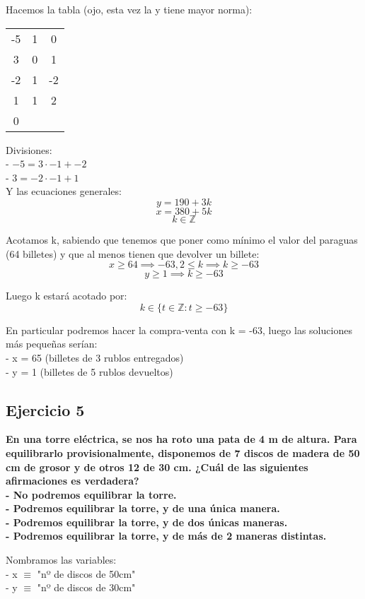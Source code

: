 \documentclass[11pt, a4paper, titlepage]{article}
\providecommand{\ent}{\mathbb{Z}}
\begin{document}
Hacemos la tabla (ojo, esta vez la y tiene mayor norma):

\begin{center}
\begin{tabular}{c|cc}
-5 & 1 & 0 \\
3 & 0 & 1 \\
\hline
-2 & 1 & -2 \\
\hline
1 & 1 & 2 \\
\hline
0
\end{tabular}
\end{center}

Divisiones: \\
- $ -5 = 3 \cdot -1 + -2 $ \\
- $ 3 = -2 \cdot -1 + 1 $ \\

Y las ecuaciones generales:
$$ y = 190 + 3k $$
$$ x = 380 + 5k $$
$$ k \in \ent $$

Acotamos k, sabiendo que tenemos que poner como mínimo el valor del paraguas (64 billetes) y que al menos tienen que devolver un billete:
$$ x \geq 64 \implies -63,2 \leq k \implies k \geq -63 $$
$$ y \geq 1 \implies k \geq -63 $$

Luego k estará acotado por:
$$ k \in \{ t \in \ent : t \geq -63 \} $$

En particular podremos hacer la compra-venta con k = -63, luego las soluciones más pequeñas serían: \\
- x = 65 (billetes de 3 rublos entregados) \\
- y = 1 (billetes de 5 rublos devueltos) \\

\subsection{\LARGE{Ejercicio 5}}

\textbf{En una torre eléctrica, se nos ha roto una pata de 4 m de altura. Para
equilibrarlo provisionalmente, disponemos de 7 discos de madera de 50 cm de grosor
y de otros 12 de 30 cm. ¿Cuál de las siguientes afirmaciones es verdadera? \\
 - No podremos equilibrar la torre. \\
 - Podremos equilibrar la torre, y de una única manera. \\
 - Podremos equilibrar la torre, y de dos únicas maneras. \\
 - Podremos equilibrar la torre, y de más de 2 maneras distintas.}

Nombramos las variables: \\
- x $\equiv$ "nº de discos de 50cm" \\
- y $\equiv$ "nº de discos de 30cm" \\
\end{document}
